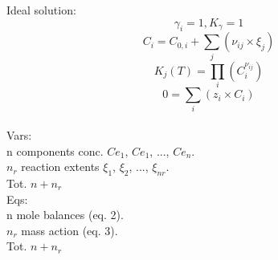 \documentclass[12pt,a4paper,preview]{standalone}
\begin{document}
Ideal solution:
\begin{equation}
\gamma_i = 1 , K_\gamma = 1
\end{equation}
\begin{equation}
C_i = C_{0,i} + \sum_j(\nu_{ij} \times \xi_j)
\end{equation}
\begin{equation}
K_j(T) = \prod_i(C_i^{\nu_{ij}})
\end{equation}
\begin{equation}
0 = \sum_i(z_i \times C_i)
\end{equation}
\\
Vars: \\
n components conc. $Ce_1$, $Ce_1$, ..., $Ce_n$. \\
$n_r$ reaction extents $\xi_1$, $\xi_2$, ..., $\xi_{nr}$. \\
Tot. $n + n_r$ \\
Eqs: \\
n mole balances (eq. 2). \\
$n_r$ mass action (eq. 3). \\
Tot. $n + n_r$
\end{document}
